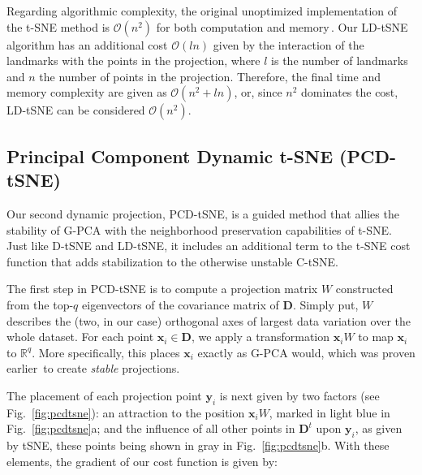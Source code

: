 Regarding algorithmic complexity, the original unoptimized implementation of the t-SNE method is $\mathcal{O}(n^2)$ for both computation and memory\,\citep{vanderMaaten2008}. Our LD-tSNE algorithm has an additional cost $\mathcal{O}(ln)$ given by the interaction of the landmarks with the points in the projection, where $l$ is the number of landmarks and $n$ the number of points in the projection. Therefore, the final time and memory complexity are given as $\mathcal{O}(n^2 + ln)$, or, since $n^2$ dominates the cost, LD-tSNE can be considered $\mathcal{O}(n^2)$. 

\subsection{Principal Component Dynamic t-SNE (PCD-tSNE)} 
\label{sec:pcd-tsne}
%
Our second dynamic projection, PCD-tSNE, is a guided method that allies the stability of G-PCA with the neighborhood preservation capabilities of t-SNE.
Just like D-tSNE and LD-tSNE, it includes an additional term to the t-SNE cost function that adds stabilization to the otherwise unstable C-tSNE. 

The first step in PCD-tSNE is to compute a projection matrix $W$ constructed from the top-$q$ eigenvectors of the covariance matrix of $\mathbf{D}$. Simply put, $W$ describes the (two, in our case) orthogonal axes of largest data variation over the whole dataset. For each point $\mathbf{x}_i \in \mathbf{D}$, we apply a transformation $\mathbf{x}_i W$ to map $\mathbf{x}_i$ to $\mathbb{R}^q$. More specifically, this places $\mathbf{x}_i$ exactly as G-PCA would, which was proven earlier\,\citep{Vernier2020} to create \emph{stable} projections.

The placement of each projection point $\mathbf{y}_i$ is next given by two factors (see Fig.~\ref{fig:pcdtsne}): an attraction to the position $\mathbf{x}_i W$, marked in light blue in Fig.~\ref{fig:pcdtsne}a; and the influence of all other points in $\mathbf{D}^t$ 
upon $\mathbf{y}_i$, as given by tSNE, these points being shown in gray in Fig.~\ref{fig:pcdtsne}b. With these elements, the gradient of our cost function is given by:  

%

